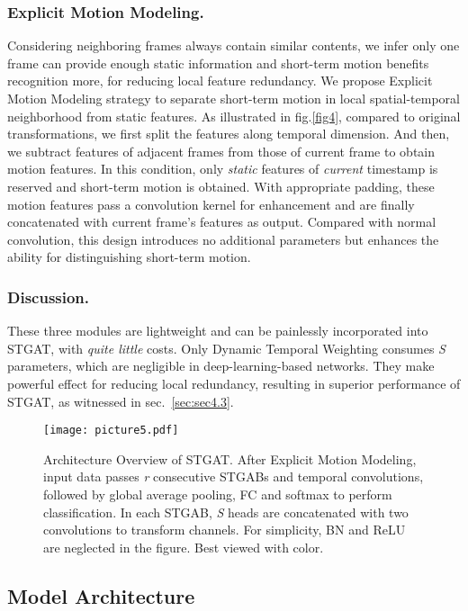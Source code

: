 \documentclass[runningheads]{llncs}
\begin{document}
\subsubsection{Explicit Motion Modeling.}
Considering neighboring frames always contain similar contents, we infer only one frame can provide enough static information and short-term motion benefits recognition more, for reducing local feature redundancy. We propose Explicit Motion Modeling strategy to separate short-term motion in local spatial-temporal neighborhood from static features. As illustrated in fig.\ref{fig4}, compared to original  transformations, we first split the features along temporal dimension. And then, we subtract features of adjacent frames from those of current frame to obtain motion features. In this condition, only \textit{static} features of \textit{current} timestamp is reserved and short-term motion is obtained. With appropriate padding, these motion features pass a  convolution kernel for enhancement and are finally concatenated with current frame's features as output. Compared with normal  convolution, this design introduces no additional parameters but enhances the ability for distinguishing short-term motion.
 
\vspace{-10px}
\subsubsection{Discussion.}
These three modules are lightweight and can be painlessly incorporated into STGAT, with \textit{quite little} costs. Only Dynamic Temporal Weighting consumes \textit{S} parameters, which are negligible in deep-learning-based networks. They make powerful effect for reducing local redundancy, resulting in superior performance of STGAT, as witnessed in sec.~\ref{sec:sec4.3}.
\begin{figure}[t]
\centering
\texttt{[image: picture5.pdf]} \caption{Architecture Overview of STGAT. After Explicit Motion Modeling, input data passes \textit{r} consecutive STGABs and temporal convolutions, followed by global average pooling, FC and softmax to perform classification. In each STGAB, \textit{S} heads are concatenated with two  convolutions to transform channels. For simplicity, BN and ReLU are neglected in the figure. Best viewed with color.}
\label{fig5}
\end{figure}
\subsection{Model Architecture}
\end{document}
